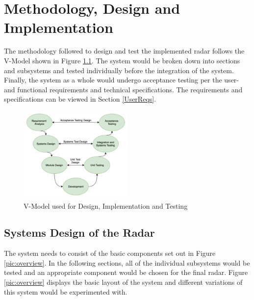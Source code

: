 \chapter{Methodology, Design and\\ Implementation}\label{chap:Methodology}


The methodology followed to design and test the implemented radar follows the V-Model shown in Figure \ref{V-Model}. The system would be broken down into sections and subsystems and tested individually before the integration of the system. Finally, the system as a whole would undergo acceptance testing per the user- and functional requirements and technical specifications. The requirements and specifications can be viewed in Section \ref{UserReqs}.

\begin{figure}[h!]
    \centering
    \includegraphics[width = 0.5\textwidth]{images/V-Model.pdf}
    \caption{V-Model used for Design, Implementation and Testing \cite{noauthor_software_2018}} \label{V-Model}
\end{figure}

\section{Systems Design of the Radar}
The system needs to consist of the basic components set out in Figure \ref{pic:overview}. In the following sections, all of the individual subsystems would be tested and an appropriate component would be chosen for the final radar. Figure \ref{pic:overview} displays the basic layout of the system and different variations of this system would be experimented with.


